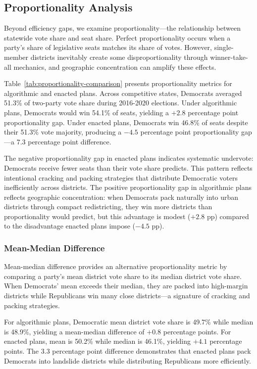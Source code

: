 \subsection{Proportionality Analysis}

Beyond efficiency gaps, we examine proportionality---the relationship between statewide vote share and seat share. Perfect proportionality occurs when a party's share of legislative seats matches its share of votes. However, single-member districts inevitably create some disproportionality through winner-take-all mechanics, and geographic concentration can amplify these effects.

Table~\ref{tab:proportionality-comparison} presents proportionality metrics for algorithmic and enacted plans. Across competitive states, Democrats averaged 51.3\% of two-party vote share during 2016-2020 elections. Under algorithmic plans, Democrats would win 54.1\% of seats, yielding a $+2.8$ percentage point proportionality gap. Under enacted plans, Democrats win 46.8\% of seats despite their 51.3\% vote majority, producing a $-4.5$ percentage point proportionality gap---a 7.3 percentage point difference.



The negative proportionality gap in enacted plans indicates systematic undervote: Democrats receive fewer seats than their vote share predicts. This pattern reflects intentional cracking and packing strategies that distribute Democratic voters inefficiently across districts. The positive proportionality gap in algorithmic plans reflects geographic concentration: when Democrats pack naturally into urban districts through compact redistricting, they win more districts than proportionality would predict, but this advantage is modest ($+2.8$ pp) compared to the disadvantage enacted plans impose ($-4.5$ pp).

\subsubsection{Mean-Median Difference}

Mean-median difference provides an alternative proportionality metric by comparing a party's mean district vote share to its median district vote share. When Democrats' mean exceeds their median, they are packed into high-margin districts while Republicans win many close districts---a signature of cracking and packing strategies.

For algorithmic plans, Democratic mean district vote share is 49.7\% while median is 48.9\%, yielding a mean-median difference of $+0.8$ percentage points. For enacted plans, mean is 50.2\% while median is 46.1\%, yielding $+4.1$ percentage points. The 3.3 percentage point difference demonstrates that enacted plans pack Democrats into landslide districts while distributing Republicans more efficiently.

